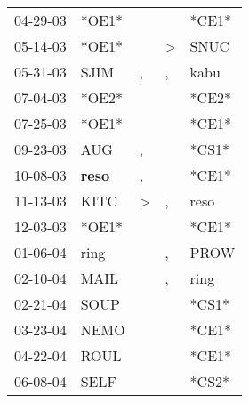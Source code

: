 \begin{supertabular}{p{0.07\textwidth}p{0.06\textwidth}p{0.02\textwidth}p{0.02\textwidth}p{0.06\textwidth}}
          04-29-03\textsuperscript{} &                            *OE1* &                  &               &                            *CE1* \\
          05-14-03\textsuperscript{} &                            *OE1* &                  &  \textgreater &           SNUC\textsuperscript{} \\
          05-31-03\textsuperscript{} &           SJIM\textsuperscript{} &                , &             , &           kabu\textsuperscript{} \\
          07-04-03\textsuperscript{} &                            *OE2* &                  &               &                            *CE2* \\
          07-25-03\textsuperscript{} &                            *OE1* &                  &               &                            *CE1* \\
          09-23-03\textsuperscript{} &            AUG\textsuperscript{} &                , &               &                            *CS1* \\
          10-08-03\textsuperscript{} &  \textbf{reso\textsuperscript{}} &                , &               &                            *CE1* \\
          11-13-03\textsuperscript{} &           KITC\textsuperscript{} &     \textgreater &             , &           reso\textsuperscript{} \\
          12-03-03\textsuperscript{} &                            *OE1* &                  &               &                            *CE1* \\
          01-06-04\textsuperscript{} &           ring\textsuperscript{} &                  &             , &           PROW\textsuperscript{} \\
          02-10-04\textsuperscript{} &           MAIL\textsuperscript{} &                  &             , &           ring\textsuperscript{} \\
          02-21-04\textsuperscript{} &           SOUP\textsuperscript{} &                  &               &                            *CS1* \\
          03-23-04\textsuperscript{} &           NEMO\textsuperscript{} &                  &               &                            *CE1* \\
          04-22-04\textsuperscript{} &           ROUL\textsuperscript{} &                  &               &                            *CE1* \\
          06-08-04\textsuperscript{} &           SELF\textsuperscript{} &                  &               &                            *CS2* \\

\end{supertabular}

